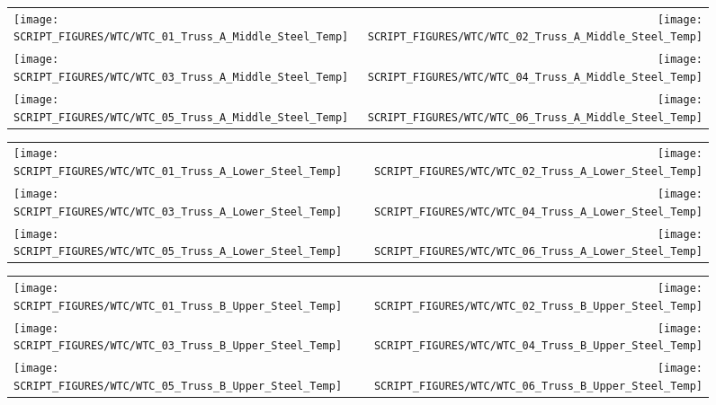 \begin{figure}[p]
\begin{tabular*}{\textwidth}{l@{\extracolsep{\fill}}r}
\texttt{[image: SCRIPT\_FIGURES/WTC/WTC\_01\_Truss\_A\_Middle\_Steel\_Temp]} &
\texttt{[image: SCRIPT\_FIGURES/WTC/WTC\_02\_Truss\_A\_Middle\_Steel\_Temp]} \\
\texttt{[image: SCRIPT\_FIGURES/WTC/WTC\_03\_Truss\_A\_Middle\_Steel\_Temp]} &
\texttt{[image: SCRIPT\_FIGURES/WTC/WTC\_04\_Truss\_A\_Middle\_Steel\_Temp]} \\
\texttt{[image: SCRIPT\_FIGURES/WTC/WTC\_05\_Truss\_A\_Middle\_Steel\_Temp]} &
\texttt{[image: SCRIPT\_FIGURES/WTC/WTC\_06\_Truss\_A\_Middle\_Steel\_Temp]}
\end{tabular*}
\label{NIST_WTC_Truss_A_Middle_Steel_Temp}
\end{figure}

\begin{figure}[p]
\begin{tabular*}{\textwidth}{l@{\extracolsep{\fill}}r}
\texttt{[image: SCRIPT\_FIGURES/WTC/WTC\_01\_Truss\_A\_Lower\_Steel\_Temp]} &
\texttt{[image: SCRIPT\_FIGURES/WTC/WTC\_02\_Truss\_A\_Lower\_Steel\_Temp]} \\
\texttt{[image: SCRIPT\_FIGURES/WTC/WTC\_03\_Truss\_A\_Lower\_Steel\_Temp]} &
\texttt{[image: SCRIPT\_FIGURES/WTC/WTC\_04\_Truss\_A\_Lower\_Steel\_Temp]} \\
\texttt{[image: SCRIPT\_FIGURES/WTC/WTC\_05\_Truss\_A\_Lower\_Steel\_Temp]} &
\texttt{[image: SCRIPT\_FIGURES/WTC/WTC\_06\_Truss\_A\_Lower\_Steel\_Temp]}
\end{tabular*}
\label{NIST_WTC_Truss_A_Lower_Steel_Temp}
\end{figure}

\begin{figure}[p]
\begin{tabular*}{\textwidth}{l@{\extracolsep{\fill}}r}
\texttt{[image: SCRIPT\_FIGURES/WTC/WTC\_01\_Truss\_B\_Upper\_Steel\_Temp]} &
\texttt{[image: SCRIPT\_FIGURES/WTC/WTC\_02\_Truss\_B\_Upper\_Steel\_Temp]} \\
\texttt{[image: SCRIPT\_FIGURES/WTC/WTC\_03\_Truss\_B\_Upper\_Steel\_Temp]} &
\texttt{[image: SCRIPT\_FIGURES/WTC/WTC\_04\_Truss\_B\_Upper\_Steel\_Temp]} \\
\texttt{[image: SCRIPT\_FIGURES/WTC/WTC\_05\_Truss\_B\_Upper\_Steel\_Temp]} &
\texttt{[image: SCRIPT\_FIGURES/WTC/WTC\_06\_Truss\_B\_Upper\_Steel\_Temp]}
\end{tabular*}
\label{NIST_WTC_Truss_B_Upper_Steel_Temp}
\end{figure}

